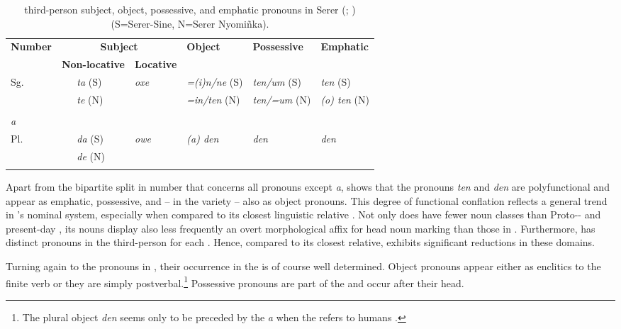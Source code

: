 \documentclass[output=paper
,newtxmath
,modfonts
,nonflat]{langsci/langscibook}
\begin{document}
\begin{table}
\begin{tabularx}{\textwidth}{XlXXXXX}
\lsptoprule
\bfseries Number & \multicolumn{3}{c}{ \bfseries Subject} & \bfseries Object & \bfseries Possessive & \bfseries Emphatic \\
& \multicolumn{2}{l}{\bfseries Non-locative} & \multicolumn{1}{l}{\bfseries Locative} &  & \\
\midrule
Sg. & & \textit{ta} (S) & \textit{oxe} & \textit{=(i)n/ne} (S) &  \textit{ten/um} (S) & \textit{ten} (S) \\
 	& & \textit{te} (N) &   & \textit{=in/ten} (N) &   \textit{ten/=um} (N) & \textit{(o) ten} (N) \\\\
 \textit{a} & & & & & \\
Pl. &  & \textit{da} (S) &   \textit{owe} & \textit{(a) den} & \textit{den} & \textit{den} \\
 & & \textit{de} (N) & 	 &	 	\\
\lspbottomrule
\end{tabularx}
\caption{third-person subject, object, possessive, and emphatic pronouns in Serer (\citealt{Faye1979}; \citealt{Renaudier2012}) (S=Serer-Sine, N=Serer Nyomiñka).}
\label{tab:apel:1}
\end{table}

Apart from the bipartite split in number that concerns all pronouns except \textit{a},  shows that the pronouns \textit{ten} and \textit{den} are polyfunctional and appear as emphatic, possessive, and -- in the  variety -- also as object pronouns. This degree of functional conflation reflects a general trend in ’s nominal system, especially when compared to its closest linguistic relative . Not only does  have fewer noun classes than Proto-- and present-day  \citep{Merrill14}, its nouns display also less frequently an overt morphological affix for head noun marking than those in . Furthermore,  has distinct pronouns in the third-person for each . Hence, compared to its closest relative,  exhibits significant reductions in these domains. 

Turning again to the pronouns in , their occurrence in the  is of course well determined. Object pronouns appear either as enclitics to the finite verb or they are simply postverbal.\footnote{The plural object  \textit{den} seems only to be preceded by the  \textit{a} when the  refers to humans \citep[112-116]{Renaudier2012}.} Possessive pronouns are part of the  and occur after their head.
\end{document}
